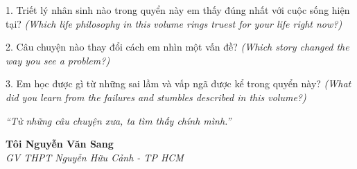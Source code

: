 \begin{tcolorbox}[
  colback=truyengold!10, colframe=truyengold!70!black,
  coltitle=black, fonttitle=\bfseries,
  title={T\textit{ự} H\textit{ọ}c Nhanh},
  arc=4pt, boxrule=1pt, breakable, enhanced
]
1. Triết lý nhân sinh nào trong quyển này em thấy đúng nhất với cuộc sống hiện tại? \textit{(Which life philosophy in this volume rings truest for your life right now?)}

2. Câu chuyện nào thay đổi cách em nhìn một vấn đề? \textit{(Which story changed the way you see a problem?)}

3. Em học được gì từ những sai lầm và vấp ngã được kể trong quyển này? \textit{(What did you learn from the failures and stumbles described in this volume?)}
\end{tcolorbox}

\begin{center}
\textit{\color{truyengold}``Từ những câu chuyện xưa, ta tìm thấy chính mình.''}
\end{center}

\begin{flushright}
\textbf{Tôi Nguyễn Văn Sang}\\
\textit{GV THPT Nguyễn Hữu Cảnh - TP HCM}
\end{flushright}

\ngancach
